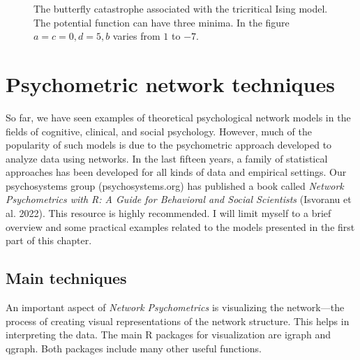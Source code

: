 \documentclass[
  a4paper,
  DIV=11,
  numbers=noendperiod,
  oneside]{scrreprt}
\begin{document}
\begin{figure}


\caption{\label{fig-ch6-img15-old-84}The butterfly catastrophe
associated with the tricritical Ising model. The potential function can
have three minima. In the figure \(a = c = 0, d = 5, b\) varies from
\(1\) to \(-7\).}

\end{figure}%

\section{Psychometric network
techniques}\label{sec-Psychometric-network-techniques}

So far, we have seen examples of theoretical psychological network
models in the fields of cognitive, clinical, and social psychology.
However, much of the popularity of such models is due to the
psychometric approach developed to analyze data using networks. In the
last fifteen years, a family of statistical approaches has been
developed for all kinds of data and empirical settings. Our
psychosystems group (psychosystems.org) has published a book called
\emph{Network Psychometrics with R: A Guide for Behavioral and Social
Scientists} (Isvoranu et al. 2022). This resource is highly recommended.
I will limit myself to a brief overview and some practical examples
related to the models presented in the first part of this chapter.

\subsection{Main techniques}\label{sec-Main-techniques}

An important aspect of \emph{Network Psychometrics} is visualizing the
network---the process of creating visual representations of the network
structure. This helps in interpreting the data. The main R packages for
visualization are igraph and qgraph. Both packages include many other
useful functions.
\end{document}
